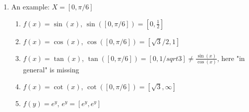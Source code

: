 \begin{itemize}
\begin{*example}
\begin{enumerate}
\begin{itemize}
				\item $A^2=[0,+9]$
				\item $A/B=[-3/2,+1/2]$, S$_/=\set{-3/2,-3/4,1/2,1/4}$ 
				\item $A*1/B=[-3,1]*[1/b,1/b]=[-3/2,1/2]$
				\item $B/A=$ prohibited, since $0\in A$
				\item $B/B=[2/4,4/2]*[1/2,2]$, S$_/=\{1,2/4,4/2,1\}$
				\item The value range of a function over an interval $X=[x,x]$ $W_f(X)=\{f(x)|x\in X\} \to $ interval hulls take hull(W$_f(X)$)$\in IR$
			\end{itemize}
		\item An example: $X=[0,\pi/6]$
			\begin{enumerate}
				\item $f(x)=\sin(x)$, $\sin([0,\pi/6])=[0,\frac{1}{2}]$
				\item $f(x)=\cos(x)$, $\cos([0,\pi/6])=[\sqrt{3}/2,1]$
				\item $f(x)=\tan(x)$, $\tan([0,\pi/6])=[0,1/sqrt{3}] \neq\frac{\sin(x)}{\cos(x)}$, here "in general" is missing 
				\item $f(x)=\cot(x)$, $\cot([0,\pi/6])=[\sqrt{3}, \infty]$
				\item $f(y)=e^y$, $e^y=[e^y, e^y]$ 
			\end{enumerate}
		\end{enumerate}
	\end{*example}
	 

\end{itemize}
